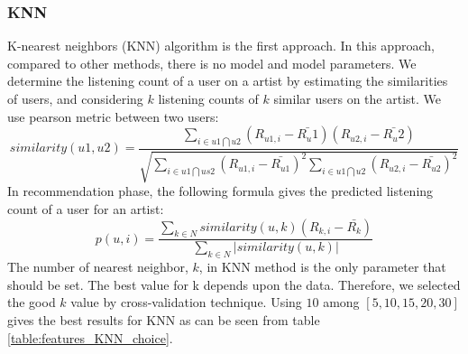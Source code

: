 \subsubsection{KNN}
K-nearest neighbors (KNN) algorithm is the first approach. In this approach, compared to other methods, there is no model and model parameters. We determine the listening count of a user on a artist by estimating the similarities of users, and considering $k$ listening counts of $k$ similar users on the artist. We use pearson metric between two users:
\begin{equation}
  similarity(u1, u2)=\frac{\sum_{i\in u1 \bigcap u2} (R_{u1,i} - \bar{R_u1})(R_{u2,i} - \bar{R_u2})}{\sqrt{\sum_{i\in u1 \bigcap us2} (R_{u1,i} - \bar{R_{u1}})^2 \sum_{i\in u1 \bigcap u2} (R_{u2,i} - \bar{R_{u2}})^2}}
\end{equation}
In recommendation phase, the following formula gives the predicted listening count of a user for an artist:
 \begin{equation}
  p(u, i)=\frac{\sum_{k \in N} similarity(u, k) (R_{k,i} - \bar{R_k})}{\sum_{k \in N} | similarity(u, k) |}
\end{equation}
The number of nearest neighbor, $k$, in KNN method is the only parameter that should be set. The best value for k depends upon the data. Therefore, we selected the good $k$ value by cross-validation technique. Using $10$ among $[5, 10, 15, 20, 30]$ gives the best results for KNN as can be seen from table \ref{table:features_KNN_choice}. 

